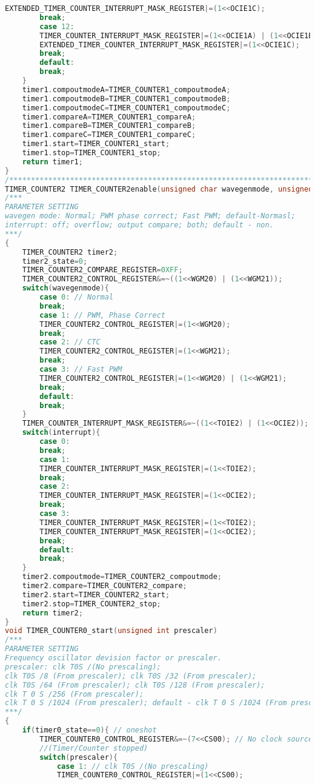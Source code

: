 \begin{lstlisting}[language=C]
		EXTENDED_TIMER_COUNTER_INTERRUPT_MASK_REGISTER|=(1<<OCIE1C);
		break;
		case 12:
		TIMER_COUNTER_INTERRUPT_MASK_REGISTER|=(1<<OCIE1A) | (1<<OCIE1B);
		EXTENDED_TIMER_COUNTER_INTERRUPT_MASK_REGISTER|=(1<<OCIE1C);
		break;
		default:
		break;
	}
	timer1.compoutmodeA=TIMER_COUNTER1_compoutmodeA;
	timer1.compoutmodeB=TIMER_COUNTER1_compoutmodeB;
	timer1.compoutmodeC=TIMER_COUNTER1_compoutmodeC;
	timer1.compareA=TIMER_COUNTER1_compareA;
	timer1.compareB=TIMER_COUNTER1_compareB;
	timer1.compareC=TIMER_COUNTER1_compareC;
	timer1.start=TIMER_COUNTER1_start;
	timer1.stop=TIMER_COUNTER1_stop;
	return timer1;
}
/*****************************************************************************************/
TIMER_COUNTER2 TIMER_COUNTER2enable(unsigned char wavegenmode, unsigned char interrupt)
/***
PARAMETER SETTING
wavegen mode: Normal; PWM phase correct; Fast PWM; default-Normasl;
interrupt: off; overflow; output compare; both; default - non.
***/
{
	TIMER_COUNTER2 timer2;
	timer2_state=0;
	TIMER_COUNTER2_COMPARE_REGISTER=0XFF;
	TIMER_COUNTER2_CONTROL_REGISTER&=~((1<<WGM20) | (1<<WGM21));
	switch(wavegenmode){
		case 0: // Normal
		break;
		case 1: // PWM, Phase Correct
		TIMER_COUNTER2_CONTROL_REGISTER|=(1<<WGM20);
		break;
		case 2: // CTC
		TIMER_COUNTER2_CONTROL_REGISTER|=(1<<WGM21);
		break;
		case 3: // Fast PWM
		TIMER_COUNTER2_CONTROL_REGISTER|=(1<<WGM20) | (1<<WGM21);
		break;
		default:
		break;
	}
	TIMER_COUNTER_INTERRUPT_MASK_REGISTER&=~((1<<TOIE2) | (1<<OCIE2));
	switch(interrupt){
		case 0: 
		break;
		case 1:
		TIMER_COUNTER_INTERRUPT_MASK_REGISTER|=(1<<TOIE2);
		break;
		case 2:
		TIMER_COUNTER_INTERRUPT_MASK_REGISTER|=(1<<OCIE2);
		break;
		case 3:
		TIMER_COUNTER_INTERRUPT_MASK_REGISTER|=(1<<TOIE2);
		TIMER_COUNTER_INTERRUPT_MASK_REGISTER|=(1<<OCIE2);
		break;
		default:
		break;
	}
	timer2.compoutmode=TIMER_COUNTER2_compoutmode;
	timer2.compare=TIMER_COUNTER2_compare;
	timer2.start=TIMER_COUNTER2_start;
	timer2.stop=TIMER_COUNTER2_stop;
	return timer2;
}
void TIMER_COUNTER0_start(unsigned int prescaler)
/***
PARAMETER SETTING
Frequency oscillator devision factor or prescaler.
prescaler: clk T0S /(No prescaling);
clk T0S /8 (From prescaler); clk T0S /32 (From prescaler);
clk T0S /64 (From prescaler); clk T0S /128 (From prescaler);
clk T 0 S /256 (From prescaler);
clk T 0 S /1024 (From prescaler); default - clk T 0 S /1024 (From prescaler).
***/
{
	if(timer0_state==0){ // oneshot
		TIMER_COUNTER0_CONTROL_REGISTER&=~(7<<CS00); // No clock source.
		//(Timer/Counter stopped)
		switch(prescaler){
			case 1: // clk T0S /(No prescaling)
			TIMER_COUNTER0_CONTROL_REGISTER|=(1<<CS00);

\end{lstlisting}
